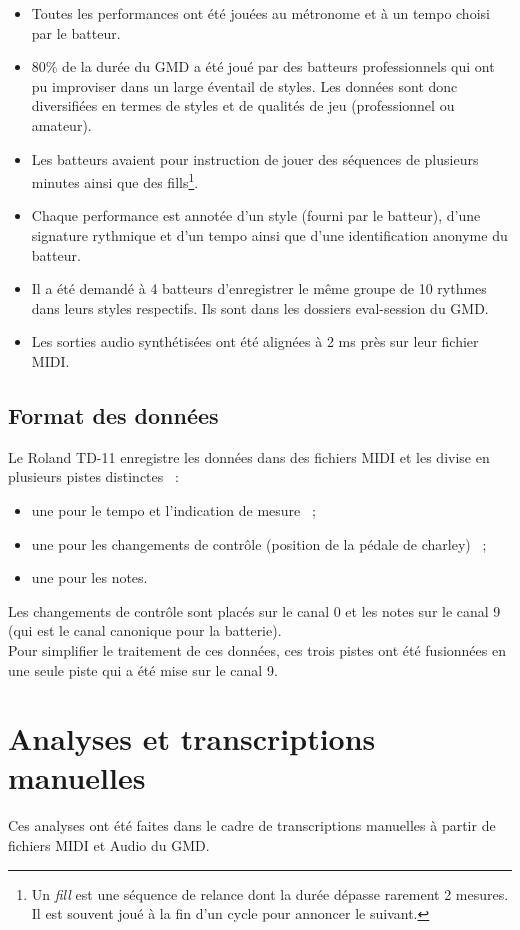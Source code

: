 \begin{itemize}
	\item Toutes les performances ont été jouées au métronome et à un tempo
        choisi par le batteur.
	\item 80\% de la durée du GMD a été joué par des batteurs professionnels
        qui ont pu improviser dans un large éventail de styles. Les données
        sont donc diversifiées en termes de styles et de qualités de jeu
        (professionnel ou amateur).
	\item Les batteurs avaient pour instruction de jouer des séquences de
        plusieurs minutes ainsi que des fills\footnote{Un \textit{fill} est une
        séquence de relance dont la durée dépasse rarement 2 mesures. Il est
        souvent joué à la fin d’un cycle pour annoncer le suivant.}.
	\item Chaque performance est annotée d’un style (fourni par le batteur),
        d’une signature rythmique et d’un tempo ainsi que d’une identification
        anonyme du batteur.
	\item Il a été demandé à 4 batteurs d’enregistrer le même groupe de 10
        rythmes dans leurs styles respectifs. Ils sont dans les dossiers
        eval-session du GMD.
	\item Les sorties audio synthétisées ont été alignées à 2 ms près sur leur
        fichier MIDI.
\end{itemize}

\subsection*{Format des données}
Le Roland TD-11 enregistre les données dans des fichiers MIDI et les divise en
plusieurs pistes distinctes~ :
\begin{itemize}
	\item une pour le tempo et l’indication de mesure~ ;
	\item une pour les changements de contrôle (position de la pédale de
        charley)~ ;
	\item une pour les notes.\\
\end{itemize}
Les changements de contrôle sont placés sur le canal 0 et les notes sur le
canal 9 (qui est le canal canonique pour la batterie).\\
Pour simplifier le traitement de ces données, ces trois pistes ont été
fusionnées en une seule piste qui a été mise sur le canal 9.

\section{Analyses et transcriptions manuelles}
\label{analyses_et_TM}
Ces analyses ont été faites dans le cadre de transcriptions manuelles à partir
de fichiers MIDI et Audio du GMD.

